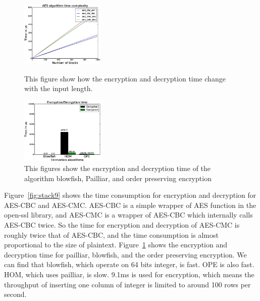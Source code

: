 \begin{figure}   
  \begin{minipage}[t]{0.5\linewidth}  
    \centering   
    \includegraphics[width=4.0cm]{images/aes.eps}   
    \caption{This figure show how the encryption and decryption time change with the input length.}   
    \label{fig:stack9}   
  \end{minipage}%
  \begin{minipage}[t]{0.5\linewidth}   
    \centering   
    \includegraphics[width=4.0cm]{images/time.eps}   
    \caption{This figures show the encryption and decryption time of the algorithm blowfish, Pailliar, and order preserving encryption}   
    \label{fig:stack10}   
  \end{minipage}   
\end{figure}







Figure~\ref{fig:stack9} shows the time consumption for encryption and decryption for AES-CBC and AES-CMC. AES-CBC is a simple wrapper of AES function in the open-ssl library, and AES-CMC is a wrapper of AES-CBC  which internally calls AES-CBC twice. So the time for encryption and decryption of AES-CMC is roughly twice that of AES-CBC, and the time consumption is almost proportional to the size of plaintext. Figure~\ref{fig:stack10} shows the encryption and decryption time for pailliar, blowfish, and the order preserving encryption. We can find that blowfish, which operate on 64 bits integer, is fast. OPE is also fast. HOM, which uses pailliar, is slow. 9.1ms is used for encryption, which means the throughput of inserting one column of integer is limited to around 100 rows per second.

